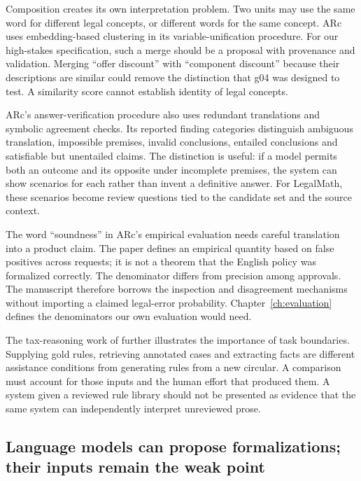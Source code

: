 \documentclass[12pt,a4paper,oneside,openany]{book}
\begin{document}
Composition creates its own interpretation problem. Two units may use the same
word for different legal concepts, or different words for the same concept.
ARc uses embedding-based clustering in its variable-unification procedure.
For our high-stakes specification, such a merge should be a proposal with
provenance and validation. Merging ``offer discount'' with ``component
discount'' because their descriptions are similar could remove the distinction
that g04 was designed to test. A similarity score cannot establish identity
of legal concepts.

ARc's answer-verification procedure also uses redundant translations and
symbolic agreement checks. Its reported finding categories distinguish
ambiguous translation, impossible premises, invalid conclusions, entailed
conclusions and satisfiable but unentailed claims. The distinction is useful:
if a model permits both an outcome and its opposite under incomplete premises,
the system can show scenarios for each rather than invent a definitive answer.
For LegalMath, these scenarios become review questions tied to the candidate
set and the source context.

The word ``soundness'' in ARc's empirical evaluation needs careful translation
into a product claim. The paper defines an empirical quantity based on false
positives across requests; it is not a theorem that the English policy was
formalized correctly. The denominator differs from precision among approvals.
The manuscript therefore borrows the inspection and disagreement mechanisms
without importing a claimed legal-error probability. Chapter~\ref{ch:evaluation}
defines the denominators our own evaluation would need.

The tax-reasoning work of \citet{jurayj2026} further illustrates the importance
of task boundaries. Supplying gold rules, retrieving annotated cases and
extracting facts are different assistance conditions from generating rules
from a new circular. A comparison must account for those inputs and the human
effort that produced them. A system given a reviewed rule library should not
be presented as evidence that the same system can independently interpret
unreviewed prose.

\subsection{Language models can propose formalizations; their inputs remain the weak point}
\label{merge:P-02-literature:07}
\end{document}
